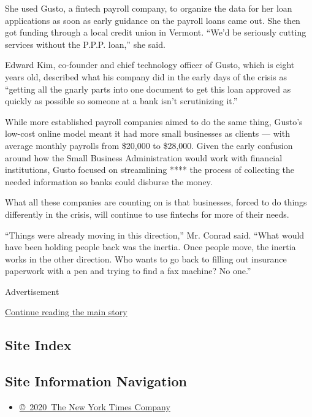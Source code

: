 She used Gusto, a fintech payroll company, to organize the data for her
loan applications as soon as early guidance on the payroll loans came
out. She then got funding through a local credit union in Vermont.
``We'd be seriously cutting services without the P.P.P. loan,'' she
said.

Edward Kim, co-founder and chief technology officer of Gusto, which is
eight years old, described what his company did in the early days of the
crisis as ``getting all the gnarly parts into one document to get this
loan approved as quickly as possible so someone at a bank isn't
scrutinizing it.''

While more established payroll companies aimed to do the same thing,
Gusto's low-cost online model meant it had more small businesses as
clients --- with average monthly payrolls from \$20,000 to \$28,000.
Given the early confusion around how the Small Business Administration
would work with financial institutions, Gusto focused on streamlining
**** the process of collecting the needed information so banks could
disburse the money.

What all these companies are counting on is that businesses, forced to
do things differently in the crisis, will continue to use fintechs for
more of their needs.

``Things were already moving in this direction,'' Mr. Conrad said.
``What would have been holding people back was the inertia. Once people
move, the inertia works in the other direction. Who wants to go back to
filling out insurance paperwork with a pen and trying to find a fax
machine? No one.''

Advertisement

\protect\hyperlink{after-bottom}{Continue reading the main story}

\hypertarget{site-index}{%
\subsection{Site Index}\label{site-index}}

\hypertarget{site-information-navigation}{%
\subsection{Site Information
Navigation}\label{site-information-navigation}}

\begin{itemize}
\tightlist
\item
  \href{https://help.nytimes3xbfgragh.onion/hc/en-us/articles/115014792127-Copyright-notice}{©~2020~The
  New York Times Company}
\end{itemize}

